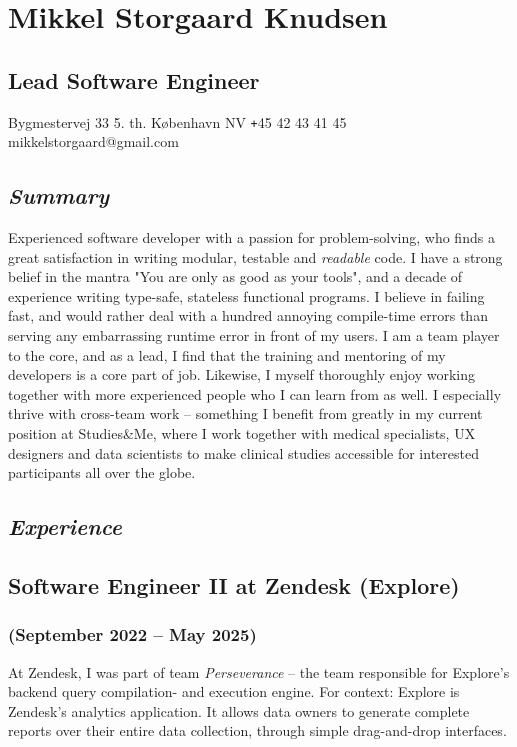 \documentclass[10pt, a4paper]{article}
\newcommand{\sme}{Studies\&Me}
\begin{document}
\section*{Mikkel Storgaard Knudsen}
\subsection*{Lead Software Engineer}
Bygmestervej 33 5. th.  København NV \newline
\texttt{+}45 42 43 41 45 \newline
mikkelstorgaard@gmail.com
\subsection*{\textit{Summary}}
Experienced software developer with a passion for problem-solving, who finds a great satisfaction in writing modular, testable and \textit{readable} code. I have a strong belief in the mantra "You are only as good as your tools", and a decade of experience writing type-safe, stateless functional programs. \newline
I believe in failing fast, and would rather deal with a hundred annoying compile-time errors than serving any embarrassing runtime error in front of my users. \newline
I am a team player to the core, and as a lead, I find that the training and mentoring of my developers is a core part of job. Likewise, I myself thoroughly enjoy working together with more experienced people who I can learn from as well. I especially thrive with cross-team work -- something I benefit from greatly in my current position at \sme, where I work together with medical specialists, UX designers and data scientists to make clinical studies accessible for interested participants all over the globe.

\subsection*{\textit{Experience}}
\subsection*{Software Engineer II at Zendesk (Explore)}
\subsubsection*{{\normalfont(September 2022 -- May 2025)}}
At Zendesk, I was part of team \textit{Perseverance} -- the team responsible for Explore's backend query compilation- and execution engine. 
For context: Explore is Zendesk's analytics application. It allows data owners to generate complete reports over their entire data collection, through simple drag-and-drop interfaces.
\end{document}
